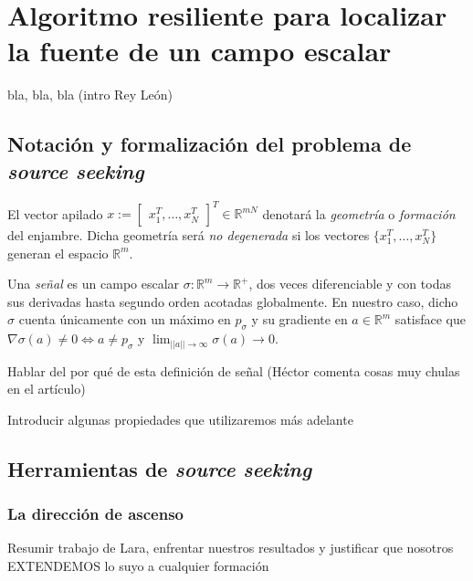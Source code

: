 \section{Algoritmo resiliente para localizar la fuente de un campo escalar}
{\color{red} bla, bla, bla (intro Rey León)}

\subsection{Notación y formalización del problema de \textit{source seeking}}

\begin{definition}
El vector apilado $x := \begin{bmatrix}x_1^T, \dots, x_N^T\end{bmatrix}^T \in \mathbb{R}^{mN}$ denotará la \textit{geometría} o \textit{formación} del enjambre. Dicha geometría será \textit{no degenerada} si los vectores $\{x_1^T, \dots, x_N^T\}$ generan el espacio $\mathbb{R}^m$.
\end{definition}

\begin{definition}
Una \textit{señal} es un campo escalar  $\sigma: \mathbb{R}^m \to \mathbb{R}^+$, dos veces diferenciable y con todas sus derivadas hasta segundo orden acotadas globalmente. En nuestro caso, dicho $\sigma$ cuenta únicamente con un máximo en $p_\sigma$ y su gradiente en $a\in\mathbb{R}^m$ satisface que  $\nabla\sigma(a) \neq 0 \iff a \neq p_\sigma$ y $\lim_{||a||\to\infty}\sigma(a) \to 0$.
\end{definition}

{\color{red} Hablar del por qué de esta definición de señal (Héctor comenta cosas muy chulas en el artículo)}

{\color{red} Introducir algunas propiedades que utilizaremos más adelante}

\subsection{Herramientas de \textit{source seeking}}

\subsubsection{La dirección de ascenso}

\cite{brinon2015distributed}
{\color{red} Resumir trabajo de Lara, enfrentar nuestros resultados y justificar que nosotros EXTENDEMOS lo suyo a cualquier formación}

